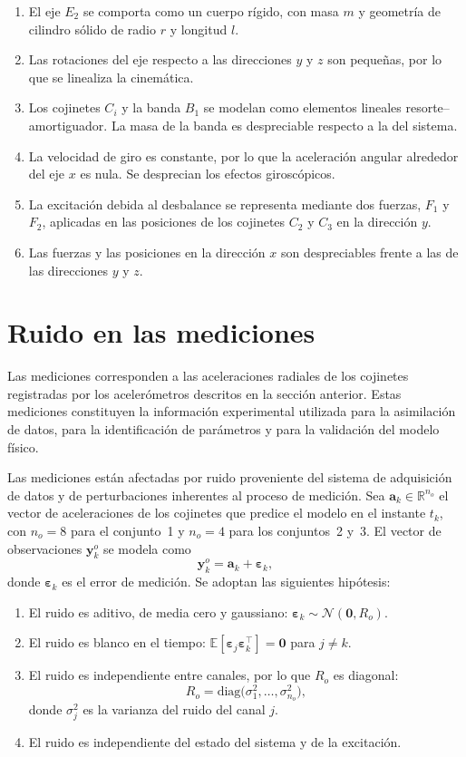 \begin{enumerate}
\item El eje $E_2$ se comporta como un cuerpo rígido, con masa $m$ y geometría de cilindro sólido de radio $r$ y longitud $l$.
\item Las rotaciones del eje respecto a las direcciones $y$ y $z$ son pequeñas, por lo que se linealiza la cinemática.
\item Los cojinetes $C_i$ y la banda $B_1$ se modelan como elementos lineales resorte--amortiguador. La masa de la banda es 
despreciable respecto a la del sistema.
\item La velocidad de giro es constante, por lo que la aceleración angular alrededor del eje $x$ es nula. Se desprecian los 
efectos giroscópicos.
\item La excitación debida al desbalance se representa mediante dos fuerzas, $F_1$ y $F_2$, aplicadas en las posiciones 
de los cojinetes $C_2$ y $C_3$ en la dirección $y$.
\item Las fuerzas y las posiciones en la dirección $x$ son despreciables frente a las de las direcciones $y$ y $z$.
\end{enumerate}

\section{Ruido en las mediciones}

Las mediciones corresponden a las aceleraciones radiales de los cojinetes registradas por los acelerómetros descritos en la 
sección anterior. Estas mediciones constituyen la información experimental utilizada para la asimilación de datos, para la 
identificación de parámetros y para la validación del modelo físico.

Las mediciones están afectadas por ruido proveniente del sistema de adquisición de datos y de perturbaciones inherentes al 
proceso de medición. Sea $\mathbf a_k\in\mathbb R^{n_o}$ el vector de aceleraciones de los cojinetes que predice el modelo 
en el instante $t_k$, con $n_o=8$ para el conjunto~1 y $n_o=4$ para los conjuntos~2 y~3. El vector de observaciones 
$\mathbf y^o_k$ se modela como
\[
\mathbf y^o_k=\mathbf a_k+\boldsymbol\varepsilon_k,
\]
donde $\boldsymbol\varepsilon_k$ es el error de medición. Se adoptan las siguientes hipótesis:

\begin{enumerate}
\item El ruido es aditivo, de media cero y gaussiano: $\boldsymbol\varepsilon_k\sim\mathcal N(\mathbf 0,R_o)$.
\item El ruido es blanco en el tiempo: $\mathbb E[\boldsymbol\varepsilon_j\boldsymbol\varepsilon_k^\top]=\mathbf 0$ para $j\neq k$.
\item El ruido es independiente entre canales, por lo que $R_o$ es diagonal:
\[
R_o=\mathrm{diag}\big(\sigma_1^2,\ldots,\sigma_{n_o}^2\big),
\]
donde $\sigma_j^2$ es la varianza del ruido del canal $j$.
\item El ruido es independiente del estado del sistema y de la excitación.
\end{enumerate}

